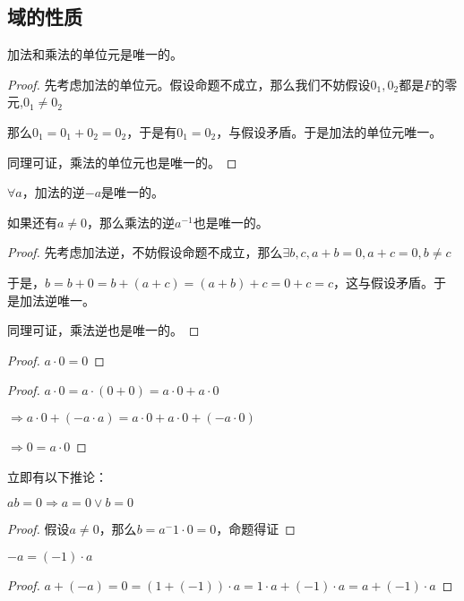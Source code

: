 \documentclass[12pt, a4paper, oneside, UTF8]{ctexbook}
\begin{document}
		\subsection{域的性质}
		\begin{para}{0}
			\point{}
				\begin{proposition}
					加法和乘法的单位元是唯一的。
				\end{proposition}
				\begin{proof}
					先考虑加法的单位元。假设命题不成立，那么我们不妨假设$0_1,0_2$都是$F$的零元,$0_1 \neq 0_2$
					
					那么$0_1=0_1+0_2=0_2$，于是有$0_1 = 0_2$，与假设矛盾。于是加法的单位元唯一。
					
					同理可证，乘法的单位元也是唯一的。
				\end{proof}
			\point{}
				\begin{proposition}
					$\forall a$，加法的逆$-a$是唯一的。
					
					如果还有$a \neq 0$，那么乘法的逆$a^{-1}$也是唯一的。
				\end{proposition}
				\begin{proof}
					先考虑加法逆，不妨假设命题不成立，那么$\exists b,c,a+b=0,a+c=0,b \neq c$
					
					于是，$b = b+ 0=b+(a+c)=(a+b)+c=0+c=c$，这与假设矛盾。于是加法逆唯一。
					
					同理可证，乘法逆也是唯一的。
				\end{proof}
			\point{}
				\begin{proof}
					$a\cdot 0 = 0$
				\end{proof}
				\begin{proof}
					$a \cdot 0=a\cdot (0+0)=a\cdot 0+a\cdot 0$
					
					$\Rightarrow a\cdot 0+(-a \cdot a)=a\cdot 0 + a\cdot 0+(-a\cdot 0)$
					
					$\Rightarrow 0=a \cdot 0$
				\end{proof}
				立即有以下推论：
				\begin{corollary}{}{}
					$ab=0 \Rightarrow a = 0 \vee b=0$
				\end{corollary}
				\begin{proof}
					假设$a \neq 0$，那么$b = a^-1 \cdot 0=0$，命题得证
				\end{proof}
			\point{}
				\begin{proposition}
					$-a = (-1)\cdot a$
				\end{proposition}
				\begin{proof}
					$a + (-a) = 0 = \left(1+ (-1)\right) \cdot a = 1 \cdot a + (-1)\cdot a=a+(-1)\cdot a$
					

\end{proof}
\end{para}
\end{document}
